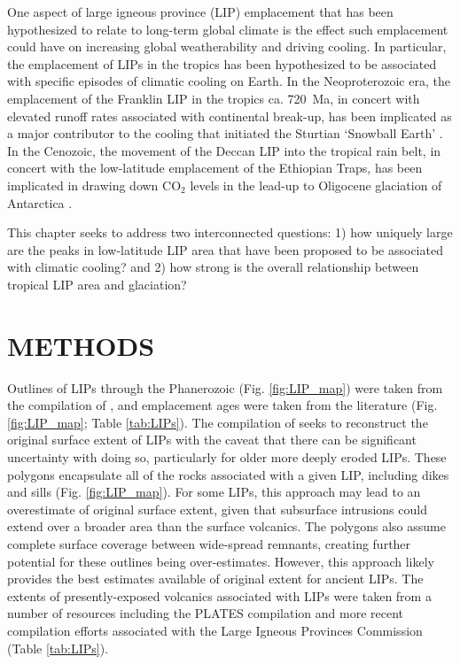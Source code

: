 \documentclass[11pt,letterpaper]{article}
\begin{document}
One aspect of large igneous province (LIP) emplacement that has been hypothesized to relate to long-term global climate is the effect such emplacement could have on increasing global weatherability and driving cooling. In particular, the emplacement of LIPs in the tropics has been hypothesized to be associated with specific episodes of climatic cooling on Earth. In the Neoproterozoic era, the emplacement of the Franklin LIP in the tropics ca. 720~Ma, in concert with elevated runoff rates associated with continental break-up, has been implicated as a major contributor to the cooling that initiated the Sturtian `Snowball Earth' \citep{Donnadieu2004b, Cox2016a}. In the Cenozoic, the movement of the Deccan LIP into the tropical rain belt, in concert with the low-latitude emplacement of the Ethiopian Traps, has been implicated in drawing down CO$_2$ levels in the lead-up to Oligocene glaciation of Antarctica \citep{Kent2008a, Kent2013a}.

This chapter seeks to address two interconnected questions: 1) how uniquely large are the peaks in low-latitude LIP area that have been proposed to be associated with climatic cooling? and 2) how strong is the overall relationship between tropical LIP area and glaciation?

\section*{METHODS}

Outlines of LIPs through the Phanerozoic (Fig. \ref{fig:LIP_map}) were taken from the compilation of \citet{Ernst2017a}, and emplacement ages were taken from the literature (Fig. \ref{fig:LIP_map}; Table \ref{tab:LIPs}). The compilation of \citet{Ernst2017a} seeks to reconstruct the original surface extent of LIPs with the caveat that there can be significant uncertainty with doing so, particularly for older more deeply eroded LIPs. These polygons encapsulate all of the rocks associated with a given LIP, including dikes and sills (Fig. \ref{fig:LIP_map}). For some LIPs, this approach may lead to an overestimate of original surface extent, given that subsurface intrusions could extend over a broader area than the surface volcanics. The polygons also assume complete surface coverage between wide-spread remnants, creating further potential for these outlines being over-estimates. However, this approach likely provides the best estimates available of original extent for ancient LIPs. The extents of presently-exposed volcanics associated with LIPs were taken from a number of resources including the PLATES compilation \citep{Coffin2006a} and more recent compilation efforts associated with the Large Igneous Provinces Commission (Table \ref{tab:LIPs}). 
\end{document}
